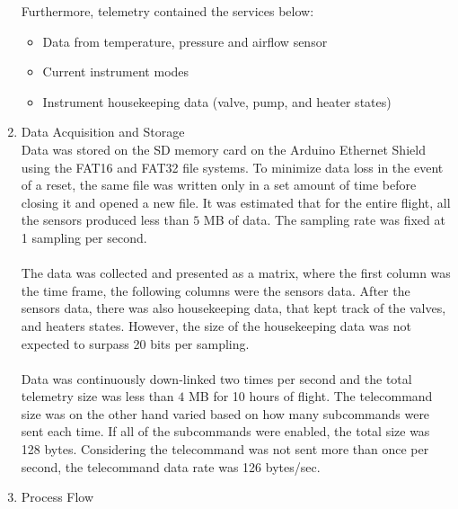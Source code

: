 \begin{enumerate}[label=(\alph*)]
Furthermore, telemetry contained the services below:
\begin{itemize}
    \item Data from temperature, pressure and airflow sensor
    \item Current instrument modes
    \item Instrument housekeeping data (valve, pump, and heater states)
\end{itemize}
\item{Data Acquisition and Storage}\\
Data was stored on the SD memory card on the Arduino Ethernet Shield using the FAT16 and FAT32 file systems. To minimize data loss in the event of a reset, the same file was written only in a set amount of time before closing it and opened a new file. It was estimated that for the entire flight, all the sensors produced less than $5$ MB of data. The sampling rate was fixed at 1 sampling per second.\\
\\
The data was collected and presented as a matrix, where the first column was the time frame, the following columns were the sensors data. After the sensors data, there was also housekeeping data, that kept track of the valves, and heaters states. However, the size of the housekeeping data was not expected to surpass 20 bits per sampling.\\
\\
Data was continuously down-linked two times per second and the total telemetry size was less than $4$ MB for 10 hours of flight. The telecommand size was on the other hand varied based on how many subcommands were sent each time. If all of the subcommands were enabled, the total size was 128 bytes. Considering the telecommand was not sent more than once per second, the telecommand data rate was 126 bytes/sec.
\item{Process Flow}\\

\end{enumerate}
